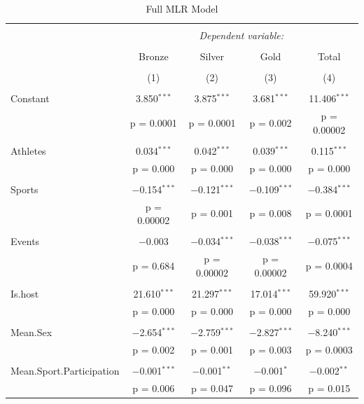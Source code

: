 \documentclass{mcmthesis}
\begin{document}
\begin{longtable}{@{\extracolsep{5pt}}lcccc} 
  \caption{Full MLR Model} 
  \label{} 
\\[-1.8ex]\hline 
\hline \\[-1.8ex] 
 & \multicolumn{4}{c}{\textit{Dependent variable:}} \\ 
\cline{2-5} 
\\[-1.8ex] & Bronze & Silver & Gold & Total \\ 
\\[-1.8ex] & (1) & (2) & (3) & (4)\\ 
\hline \\[-1.8ex] 
 Constant & 3.850$^{***}$ & 3.875$^{***}$ & 3.681$^{***}$ & 11.406$^{***}$ \\ 
  & p = 0.0001 & p = 0.0001 & p = 0.002 & p = 0.00002 \\ 
  & & & & \\ 
 Athletes & 0.034$^{***}$ & 0.042$^{***}$ & 0.039$^{***}$ & 0.115$^{***}$ \\ 
  & p = 0.000 & p = 0.000 & p = 0.000 & p = 0.000 \\ 
  & & & & \\ 
 Sports & $-$0.154$^{***}$ & $-$0.121$^{***}$ & $-$0.109$^{***}$ & $-$0.384$^{***}$ \\ 
  & p = 0.00002 & p = 0.001 & p = 0.008 & p = 0.0001 \\ 
  & & & & \\ 
 Events & $-$0.003 & $-$0.034$^{***}$ & $-$0.038$^{***}$ & $-$0.075$^{***}$ \\ 
  & p = 0.684 & p = 0.00002 & p = 0.00002 & p = 0.0004 \\ 
  & & & & \\ 
 Is.host & 21.610$^{***}$ & 21.297$^{***}$ & 17.014$^{***}$ & 59.920$^{***}$ \\ 
  & p = 0.000 & p = 0.000 & p = 0.000 & p = 0.000 \\ 
  & & & & \\ 
 Mean.Sex & $-$2.654$^{***}$ & $-$2.759$^{***}$ & $-$2.827$^{***}$ & $-$8.240$^{***}$ \\ 
  & p = 0.002 & p = 0.001 & p = 0.003 & p = 0.0003 \\ 
  & & & & \\ 
 Mean.Sport.Participation & $-$0.001$^{***}$ & $-$0.001$^{**}$ & $-$0.001$^{*}$ & $-$0.002$^{**}$ \\ 
  & p = 0.006 & p = 0.047 & p = 0.096 & p = 0.015 \\ 

\end{longtable}
\end{document}

